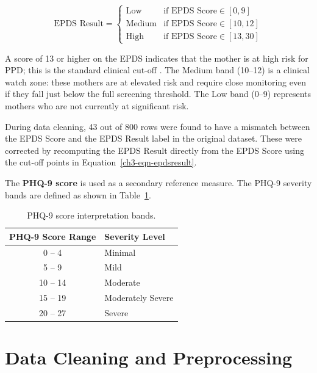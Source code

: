 \begin{equation}
\label{ch3-eqn-epdsresult}
\text{EPDS Result} =
\begin{cases}
\text{Low}    & \text{if EPDS Score} \in [0, 9] \\
\text{Medium} & \text{if EPDS Score} \in [10, 12] \\
\text{High}   & \text{if EPDS Score} \in [13, 30]
\end{cases}
\end{equation}

A score of 13 or higher on the EPDS indicates that the mother is at high risk for PPD; this is the standard clinical cut-off \cite{cox1987edinburgh}. The Medium band (10--12) is a clinical watch zone: these mothers are at elevated risk and require close monitoring even if they fall just below the full screening threshold. The Low band (0--9) represents mothers who are not currently at significant risk.

During data cleaning, 43 out of 800 rows were found to have a mismatch between the EPDS Score and the EPDS Result label in the original dataset. These were corrected by recomputing the EPDS Result directly from the EPDS Score using the cut-off points in Equation~\ref{ch3-eqn-epdsresult}.

The \textbf{PHQ-9 score} is used as a secondary reference measure. The PHQ-9 severity bands are defined as shown in Table~\ref{ch3-tbl-phq9}.

\begin{table}[htbp]
\centering
\small
\begin{tabular}{|c|l|}
\hline
\textbf{PHQ-9 Score Range} & \textbf{Severity Level} \\
\hline
0 -- 4 & Minimal \\
\hline
5 -- 9 & Mild \\
\hline
10 -- 14 & Moderate \\
\hline
15 -- 19 & Moderately Severe \\
\hline
20 -- 27 & Severe \\
\hline
\end{tabular}
\caption{PHQ-9 score interpretation bands.}
\label{ch3-tbl-phq9}
\end{table}
\FloatBarrier

\section{Data Cleaning and Preprocessing}
\label{ch3-sec-cleaning}

